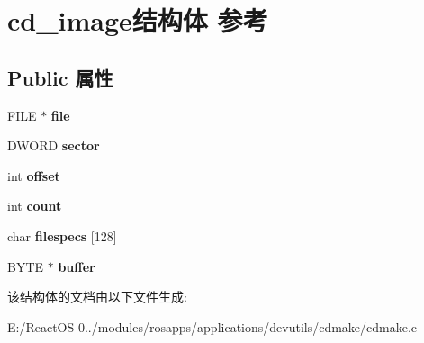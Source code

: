 \hypertarget{structcd__image}{}\section{cd\+\_\+image结构体 参考}
\label{structcd__image}
\subsection*{Public 属性}
\begin{DoxyCompactItemize}
\item 
\mbox{\label{structcd__image_a6f9edb78897067c96c9342a9514a5e0a}} 
\hyperlink{struct__iobuf}{F\+I\+LE} $\ast$ {\bfseries file}
\item 
\mbox{\label{structcd__image_a9725435df46fa5e241561045da42ea51}} 
D\+W\+O\+RD {\bfseries sector}
\item 
\mbox{\label{structcd__image_a36372eaacd23037699aa0f577c8b20da}} 
int {\bfseries offset}
\item 
\mbox{\label{structcd__image_a7a565475ff9fe6a29bbd97b96e5e1ab2}} 
int {\bfseries count}
\item 
\mbox{\label{structcd__image_aff6e6106cfd9cf3d2cd4f00fd5608a2e}} 
char {\bfseries filespecs} \mbox{[}128\mbox{]}
\item 
\mbox{\label{structcd__image_aabdcfe3601db26fb2f8f7aafd626b2aa}} 
B\+Y\+TE $\ast$ {\bfseries buffer}
\end{DoxyCompactItemize}


该结构体的文档由以下文件生成\+:\begin{DoxyCompactItemize}
\item 
E\+:/\+React\+O\+S-\/0../modules/rosapps/applications/devutils/cdmake/cdmake.\+c\end{DoxyCompactItemize}
